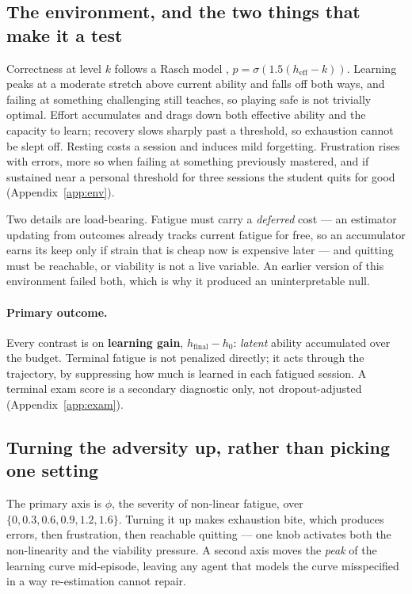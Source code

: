 \documentclass{article}
\begin{document}
\subsection{The environment, and the two things that make it a test}

Correctness at level $k$ follows a Rasch model \cite{Rasch1960}, $p=\sigma(1.5(h_{\text{eff}}-k))$. Learning peaks at a moderate stretch above current ability and falls off both ways, and failing at something challenging still teaches, so playing safe is not trivially optimal. Effort accumulates and drags down both effective ability and the capacity to learn; recovery slows sharply past a threshold, so exhaustion cannot be slept off. Resting costs a session and induces mild forgetting. Frustration rises with errors, more so when failing at something previously mastered, and if sustained near a personal threshold for three sessions the student quits for good (Appendix~\ref{app:env}).

Two details are load-bearing. Fatigue must carry a \emph{deferred} cost --- an estimator updating from outcomes already tracks current fatigue for free, so an accumulator earns its keep only if strain that is cheap now is expensive later --- and quitting must be reachable, or viability is not a live variable. An earlier version of this environment failed both, which is why it produced an uninterpretable null.

\paragraph{Primary outcome.} Every contrast is on \textbf{learning gain}, $h_{\text{final}}-h_0$: \emph{latent} ability accumulated over the budget. Terminal fatigue is not penalized directly; it acts through the trajectory, by suppressing how much is learned in each fatigued session. A terminal exam score is a secondary diagnostic only, not dropout-adjusted (Appendix~\ref{app:exam}).

\subsection{Turning the adversity up, rather than picking one setting}

The primary axis is $\phi$, the severity of non-linear fatigue, over $\{0,0.3,0.6,0.9,1.2,1.6\}$. Turning it up makes exhaustion bite, which produces errors, then frustration, then reachable quitting --- one knob activates both the non-linearity and the viability pressure. A second axis moves the \emph{peak} of the learning curve mid-episode, leaving any agent that models the curve misspecified in a way re-estimation cannot repair.
\end{document}

